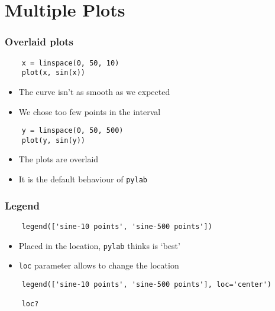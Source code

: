 \section{Multiple Plots}

\begin{frame}[fragile]
  \frametitle{Overlaid plots}
  \begin{lstlisting}
    x = linspace(0, 50, 10)
    plot(x, sin(x))
  \end{lstlisting}
  \begin{itemize}
  \item The curve isn't as smooth as we expected
  \item We chose too few points in the interval
  \end{itemize}
  \begin{lstlisting}
    y = linspace(0, 50, 500)
    plot(y, sin(y))
  \end{lstlisting}
  \begin{itemize}
  \item The plots are overlaid
  \item It is the default behaviour of \texttt{pylab}
  \end{itemize}
\end{frame}

\begin{frame}[fragile]
  \frametitle{Legend}
  \begin{lstlisting}
    legend(['sine-10 points', 'sine-500 points'])
  \end{lstlisting}
  \begin{itemize}
  \item Placed in the location, \texttt{pylab} thinks is `best'
  \item \texttt{loc} parameter allows to change the location
  \end{itemize}
  \begin{lstlisting}
    legend(['sine-10 points', 'sine-500 points'], loc='center')

    loc?
  \end{lstlisting}
\end{frame}

